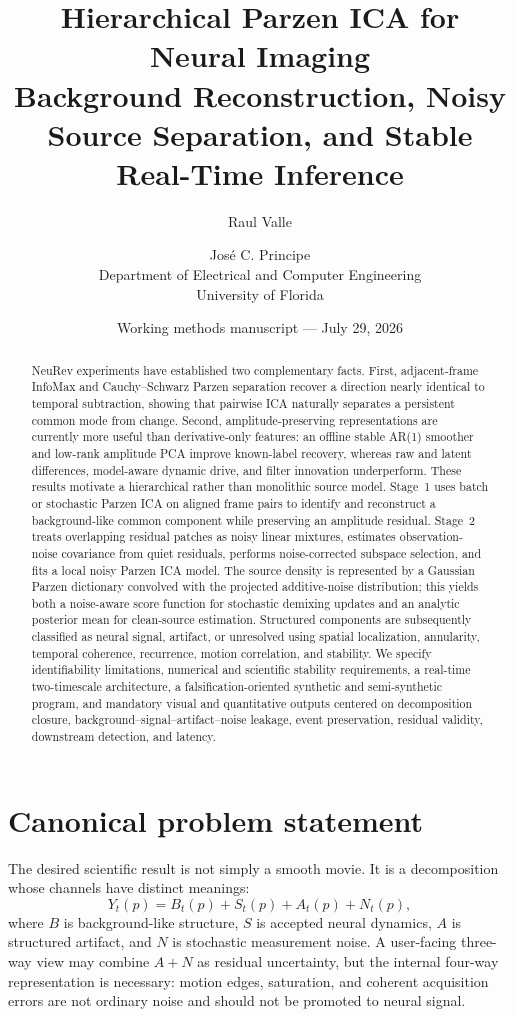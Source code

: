 \documentclass[11pt]{article}
\title{\textbf{Hierarchical Parzen ICA for Neural Imaging}\\
Background Reconstruction, Noisy Source Separation, and Stable Real-Time Inference}
\author{
Raul Valle \and Jos\'e C. Principe\\
Department of Electrical and Computer Engineering\\
University of Florida
}
\date{Working methods manuscript --- July 29, 2026}
\begin{document}
\maketitle

\begin{abstract}
NeuRev experiments have established two complementary facts. First, adjacent-frame
InfoMax and Cauchy--Schwarz Parzen separation recover a direction nearly identical
to temporal subtraction, showing that pairwise ICA naturally separates a
persistent common mode from change. Second, amplitude-preserving representations
are currently more useful than derivative-only features: an offline stable
AR(1) smoother and low-rank amplitude PCA improve known-label recovery, whereas
raw and latent differences, model-aware dynamic drive, and filter innovation
underperform. These results motivate a hierarchical rather than monolithic source
model. Stage~1 uses batch or stochastic Parzen ICA on aligned frame pairs to
identify and reconstruct a background-like common component while preserving an
amplitude residual. Stage~2 treats overlapping residual patches as noisy linear
mixtures, estimates observation-noise covariance from quiet residuals, performs
noise-corrected subspace selection, and fits a local noisy Parzen ICA model. The
source density is represented by a Gaussian Parzen dictionary convolved with the
projected additive-noise distribution; this yields both a noise-aware score
function for stochastic demixing updates and an analytic posterior mean for
clean-source estimation. Structured components are subsequently classified as
neural signal, artifact, or unresolved using spatial localization, annularity,
temporal coherence, recurrence, motion correlation, and stability. We specify
identifiability limitations, numerical and scientific stability requirements, a
real-time two-timescale architecture, a falsification-oriented synthetic and
semi-synthetic program, and mandatory visual and quantitative outputs centered
on decomposition closure, background--signal--artifact--noise leakage, event
preservation, residual validity, downstream detection, and latency.
\end{abstract}

\section{Canonical problem statement}

The desired scientific result is not simply a smooth movie. It is a decomposition
whose channels have distinct meanings:
\begin{equation}
Y_t(p)
=
B_t(p)+S_t(p)+A_t(p)+N_t(p),
\label{eq:fourway}
\end{equation}
where $B$ is background-like structure, $S$ is accepted neural dynamics, $A$ is
structured artifact, and $N$ is stochastic measurement noise. A user-facing
three-way view may combine $A+N$ as residual uncertainty, but the internal
four-way representation is necessary: motion edges, saturation, and coherent
acquisition errors are not ordinary noise and should not be promoted to neural
signal.
\end{document}
